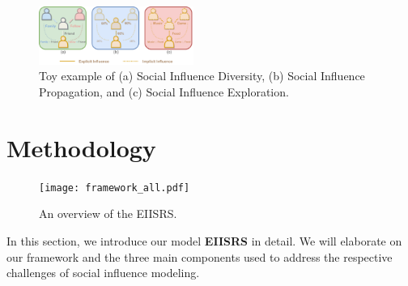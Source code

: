 \documentclass[letterpaper]{article} %
\begin{document}
\begin{figure}[ht!]
  \centering
  \includegraphics[width=0.451\textwidth]{motivation.pdf} %
  \caption{Toy example of (a) Social Influence Diversity, (b) Social Influence Propagation, and (c) Social Influence Exploration.}
  \label{fig_motivation}
\end{figure}

\section{Methodology}
\begin{figure}[ht]
  \centering
  \texttt{[image: framework\_all.pdf]}
  \caption{An overview of the EIISRS.}
  \label{framework_all.pdf}
\end{figure}

In this section, we introduce our model \textbf{EIISRS} in detail. We will elaborate on our framework and the three main components used to address the respective challenges of social influence modeling.
\end{document}
